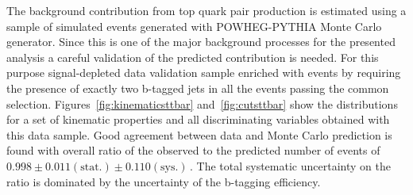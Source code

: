 The background contribution from top quark pair production is estimated using a sample of simulated events generated with POWHEG-PYTHIA Monte Carlo
generator. Since this is one of the major background processes for the presented analysis a careful validation 
of the predicted contribution is needed. For this purpose
signal-depleted data validation sample  enriched with \ttbar events  by requiring the presence of exactly two b-tagged jets in all the events
passing the common selection.
Figures~\ref{fig:kinematicsttbar} and~\ref{fig:cutsttbar} show the distributions for a set of kinematic properties and all discriminating 
variables obtained with this  data sample. Good agreement between data and Monte Carlo prediction is found with 
overall ratio of the observed to the predicted number of \ttbar events of $0.998 \pm 0.011\mathrm{(stat.)} \pm 0.110 \mathrm{(sys.)}\,.$
The total systematic uncertainty on the ratio is dominated by the uncertainty of the b-tagging efficiency. 
%

